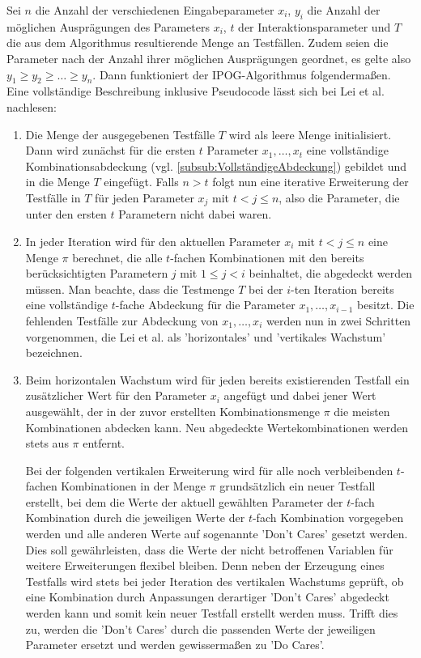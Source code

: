 Sei $n$ die Anzahl der verschiedenen Eingabeparameter $x_i$, $y_i$ die Anzahl der möglichen Ausprägungen des Parameters $x_i$, $t$ der Interaktionsparameter und $T$ die aus dem Algorithmus resultierende Menge an Testfällen. Zudem seien die Parameter nach der Anzahl ihrer möglichen Ausprägungen geordnet, es gelte also $y_1 \geq y_2 \geq \dots \geq y_n$. Dann funktioniert der IPOG-Algorithmus folgendermaßen. Eine vollständige Beschreibung inklusive Pseudocode lässt sich bei Lei et al. \cite{lei2008ipog} nachlesen:
\begin{enumerate}
\item Die Menge der ausgegebenen Testfälle $T$ wird als leere Menge initialisiert. Dann wird zunächst für die ersten $t$ Parameter $x_1,\dots,x_t$ eine vollständige Kombinationsabdeckung (vgl. \autoref{subsub:VollständigeAbdeckung}) gebildet und in die Menge $T$ eingefügt. Falls $n > t$ folgt nun eine iterative Erweiterung der Testfälle in $T$ für jeden Parameter $x_j$ mit $t < j \leq n$, also die Parameter, die unter den ersten $t$ Parametern nicht dabei waren.
\item In jeder Iteration wird für den aktuellen Parameter $x_i$ mit $t < j \leq n$ eine Menge $\pi$ berechnet, die alle $t$-fachen Kombinationen mit den bereits berücksichtigten Parametern $j$ mit $1 \leq j < i$ beinhaltet, die abgedeckt werden müssen. Man beachte, dass die Testmenge $T$ bei der $i$-ten Iteration bereits eine vollständige $t$-fache Abdeckung für die Parameter $x_1,\dots,x_{i-1}$ besitzt. Die fehlenden Testfälle zur Abdeckung von $x_1,\dots,x_i$ werden nun in zwei Schritten vorgenommen, die Lei et al. als 'horizontales' und 'vertikales Wachstum' \cite{lei2008ipog} bezeichnen.
\item Beim horizontalen Wachstum wird für jeden bereits existierenden Testfall ein zusätzlicher Wert für den Parameter $x_i$ angefügt und dabei jener Wert ausgewählt, der in der zuvor erstellten Kombinationsmenge $\pi$ die meisten Kombinationen abdecken kann. Neu abgedeckte Wertekombinationen werden stets aus $\pi$ entfernt.

Bei der folgenden vertikalen Erweiterung wird für alle noch verbleibenden $t$-fachen Kombinationen in der Menge $\pi$ grundsätzlich ein neuer Testfall erstellt, bei dem die Werte der aktuell gewählten Parameter der $t$-fach Kombination durch die jeweiligen Werte der $t$-fach Kombination vorgegeben werden und alle anderen Werte auf sogenannte 'Don't Cares' gesetzt werden. Dies soll gewährleisten, dass die Werte der nicht betroffenen Variablen für weitere Erweiterungen flexibel bleiben. Denn neben der Erzeugung eines Testfalls wird stets bei jeder Iteration des vertikalen Wachstums geprüft, ob eine Kombination durch Anpassungen derartiger 'Don't Cares' abgedeckt werden kann und somit kein neuer Testfall erstellt werden muss. Trifft dies zu, werden die 'Don't Cares' durch die passenden Werte der jeweiligen Parameter ersetzt und werden gewissermaßen zu 'Do Cares'.
\end{enumerate}

